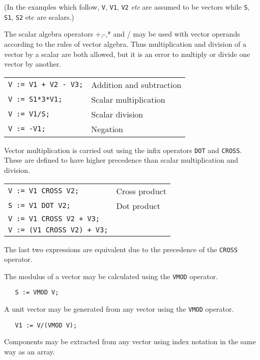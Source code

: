 \documentclass[11pt,letterpaper]{book}
\begin{document}
(In the examples which follow, {\tt V}, {\tt V1}, {\tt V2} {\em etc}
are assumed to be vectors while {\tt S}, {\tt S1}, {\tt S2} etc are
scalars.)

The scalar algebra operators +,-,* and / may be used with
vector operands according to the rules of vector algebra.
Thus multiplication and division of a vector by a scalar
are both allowed, but it is an error to multiply or
divide one vector by another.

\begin{tabular}{l l}
{\tt V := V1 + V2 - V3;} & Addition and subtraction \\
{\tt V := S1*3*V1;} & Scalar multiplication \\
{\tt V := V1/S;} & Scalar division \\
{\tt V := -V1;} & Negation \\
\end{tabular}

\noindent Vector multiplication is carried out using the infix
operators {\tt DOT} and {\tt CROSS}.  These are defined to have
higher precedence than scalar multiplication and
division.

\begin{tabular}{l l}
{\tt V := V1 CROSS V2;} & Cross product \\
{\tt S := V1 DOT V2;} & Dot product \\
{\tt V := V1 CROSS V2 + V3;} & \\
{\tt V := (V1 CROSS V2) + V3;} & \\
\end{tabular}

The last two expressions are equivalent due to the precedence of
the {\tt CROSS} operator.

The modulus of a vector may be calculated using the {\tt VMOD} operator.

{\small\begin{verbatim}
   S := VMOD V;
\end{verbatim}}

A unit vector may be generated from any vector using the {\tt VMOD}
operator.

{\small\begin{verbatim}
   V1 := V/(VMOD V);
\end{verbatim}}

Components may be extracted from any vector using index notation
in the same way as an array.
\end{document}
